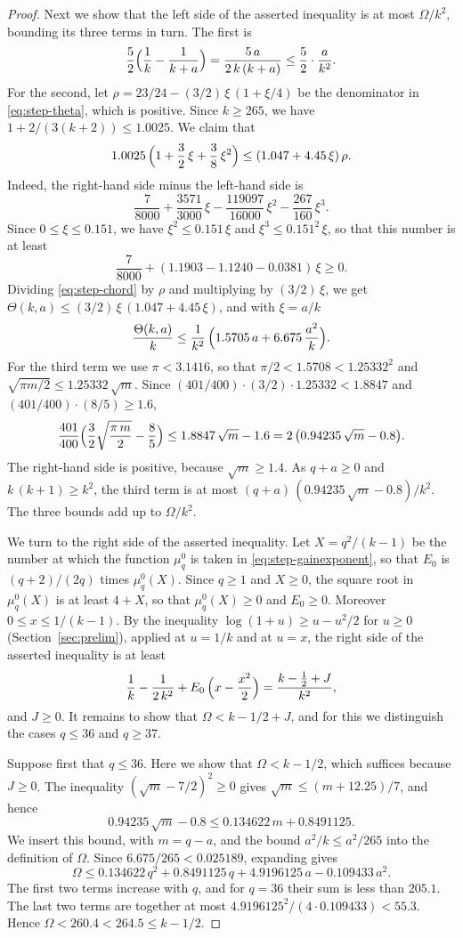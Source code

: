 \documentclass{amsart}
\theoremstyle{definition}
\theoremstyle{remark}
\numberwithin{equation}{section}
\begin{document}
\begin{proof}
Next we show that the left side of the asserted inequality is at most
$\Omega/k^2$, bounding its three terms in turn. The first is
\[
\frac52\Bigl(\frac1k-\frac1{k+a}\Bigr)=\frac{5\,a}{2\,k\,(k+a)}
\le\frac52\cdot\frac{a}{k^2}.
\]
For the second, let $\rho=23/24-(3/2)\,\xi\,(1+\xi/4)$ be the denominator
in \eqref{eq:step-theta}, which is positive. Since $k\ge265$, we have
$1+2/(3(k+2))\le1.0025$. We claim that
\begin{equation}\label{eq:step-chord}
1.0025\,\Bigl(1+\frac32\,\xi+\frac38\,\xi^2\Bigr)
\le(1.047+4.45\,\xi)\,\rho .
\end{equation}
Indeed, the right-hand side minus the left-hand side is
\[
\frac{7}{8000}+\frac{3571}{3000}\,\xi-\frac{119097}{16000}\,\xi^2
-\frac{267}{160}\,\xi^3 .
\]
Since $0\le\xi\le0.151$, we have $\xi^2\le0.151\,\xi$ and
$\xi^3\le0.151^2\,\xi$, so that this number is at least
\[
\frac{7}{8000}+(1.1903-1.1240-0.0381)\,\xi\ge0 .
\]
Dividing \eqref{eq:step-chord} by $\rho$ and multiplying by
$(3/2)\,\xi$, we get $\Theta(k,a)\le(3/2)\,\xi\,(1.047+4.45\,\xi)$, and with
$\xi=a/k$
\[
\frac{\Theta(k,a)}{k}
\le\frac{1}{k^2}\,\Bigl(1.5705\,a+6.675\,\frac{a^2}{k}\Bigr).
\]
For the third term we use $\pi<3.1416$, so that $\pi/2<1.5708<1.25332^2$ and
$\sqrt{\pi m/2}\le1.25332\,\sqrt m$. Since
$(401/400)\cdot(3/2)\cdot1.25332<1.8847$ and $(401/400)\cdot(8/5)\ge1.6$,
\[
\frac{401}{400}\Bigl(\frac32\sqrt{\frac{\pi\,m}{2}}-\frac85\Bigr)
\le1.8847\,\sqrt m-1.6=2\,\bigl(0.94235\,\sqrt m-0.8\bigr).
\]
The right-hand side is positive, because $\sqrt m\ge1.4$. As $q+a\ge0$ and
$k\,(k+1)\ge k^2$, the third term is at most
$(q+a)\,(0.94235\,\sqrt m-0.8)/k^2$. The three bounds add up to
$\Omega/k^2$.

We turn to the right side of the asserted inequality. Let $X=q^2/(k-1)$
be the number at which the function $\mu^0_q$ is taken in
\eqref{eq:step-gainexponent}, so that $E_0$ is $(q+2)/(2q)$ times
$\mu^0_q(X)$. Since $q\ge1$ and $X\ge0$, the
square root in $\mu^0_q(X)$ is at least $4+X$, so that $\mu^0_q(X)\ge0$ and
$E_0\ge0$. Moreover $0\le x\le1/(k-1)$. By the inequality
$\log(1+u)\ge u-u^2/2$ for $u\ge0$ (Section~\ref{sec:prelim}), applied at
$u=1/k$ and at $u=x$, the right side of the asserted inequality is at least
\[
\frac1k-\frac{1}{2\,k^2}+E_0\,\Bigl(x-\frac{x^2}{2}\Bigr)
=\frac{k-\frac12+J}{k^2},
\]
and $J\ge0$. It remains to show that $\Omega<k-1/2+J$, and for this we
distinguish the cases $q\le36$ and $q\ge37$.

Suppose first that $q\le36$. Here we show that $\Omega<k-1/2$, which
suffices because $J\ge0$. The inequality
$(\sqrt m-7/2)^2\ge0$ gives $\sqrt m\le(m+12.25)/7$, and hence
\[
0.94235\,\sqrt m-0.8\le0.134622\,m+0.8491125 .
\]
We insert this bound, with $m=q-a$, and the bound $a^2/k\le a^2/265$ into
the definition of $\Omega$. Since $6.675/265<0.025189$, expanding gives
\[
\Omega\le0.134622\,q^2+0.8491125\,q+4.9196125\,a-0.109433\,a^2 .
\]
The first two terms increase with $q$, and for $q=36$ their sum is less than
$205.1$. The last two terms are together at most
$4.9196125^2/(4\cdot0.109433)<55.3$. Hence
$\Omega<260.4<264.5\le k-1/2$.


\end{proof}
\end{document}
